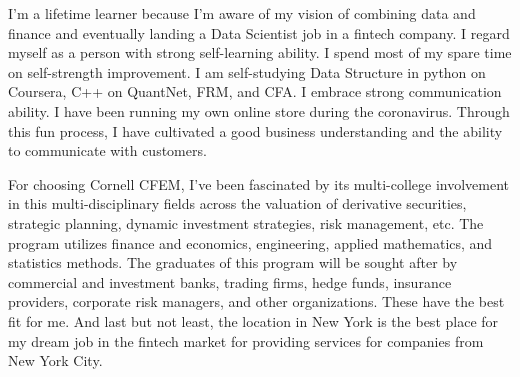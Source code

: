 \documentclass[a4paper,english]{article}
\begin{document}
I'm a lifetime learner because I'm aware of my vision of combining data and finance and eventually landing a Data Scientist job in a fintech company. I regard myself as a person with strong self-learning ability. I spend most of my spare time on self-strength improvement. I am self-studying Data Structure in python on Coursera, C++ on QuantNet, FRM, and CFA. I embrace strong communication ability. I have been running my own online store during the coronavirus. Through this fun process, I have cultivated a good business understanding and the ability to communicate with customers.

For choosing Cornell CFEM, I've been fascinated by its multi-college involvement in this multi-disciplinary fields across the valuation of derivative securities, strategic planning, dynamic investment strategies, risk management, etc. The program utilizes finance and economics, engineering, applied mathematics, and statistics methods. The graduates of this program will be sought after by commercial and investment banks, trading firms, hedge funds, insurance providers, corporate risk managers, and other organizations. These have the best fit for me. And last but not least, the location in New York is the best place for my dream job in the fintech market for providing services for companies from New York City.
\end{document}
